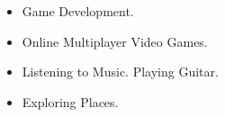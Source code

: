 \smallskip
\begin{itemize}
\item Game Development.
\smallskip 
\item Online Multiplayer Video Games.
\smallskip
\item Listening to Music. Playing Guitar.
\smallskip
\item Exploring Places.
\end{itemize}